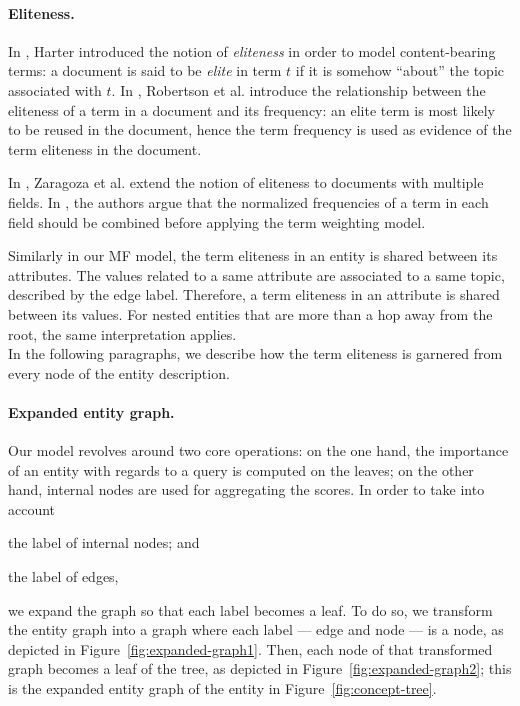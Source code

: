 \paragraph{Eliteness.}

In \cite{harter:1974:thesis}, Harter introduced the notion of \emph{eliteness} in order to model content-bearing terms: a document is said to be \emph{elite} in term $t$ if it is somehow ``about'' the topic associated with $t$. In \cite{robertson:1981:PMI}, Robertson et al. introduce the relationship between the eliteness of a term in a document and its frequency: an elite term is most likely to be reused in the document, hence the term frequency is used as evidence of the term eliteness in the document.

In \cite{zaragoza:2004:microsoft}, Zaragoza et al. extend the notion of eliteness to documents with multiple fields. In \cite{robertson:2004:cikm}, the authors argue that the normalized frequencies of a term in each field should be combined before applying the term weighting model.

Similarly in our \gls{MF} model, the term eliteness in an entity is shared between its attributes. The values related to a same attribute are associated to a same topic, described by the edge label. Therefore, a term eliteness in an attribute is shared between its values. For nested entities that are more than a hop away from the root, the same interpretation applies.\\

In the following paragraphs, we describe how the term eliteness is garnered from every node of the entity description.

\paragraph{Expanded entity graph.}

Our model revolves around two core operations: on the one hand, the importance of an entity with regards to a query is computed on the leaves; on the other hand, internal nodes are used for aggregating the scores. In order to take into account
\begin{inparaenum}[(a)]
	\item the label of internal nodes; and
	\item the label of edges,
\end{inparaenum}
we expand the graph so that each label becomes a leaf. To do so, we transform the entity graph into a graph where each label --- edge and node --- is a node, as depicted in Figure~\ref{fig:expanded-graph1}. Then, each node of that transformed graph becomes a leaf of the tree, as depicted in Figure~\ref{fig:expanded-graph2}; this is the expanded entity graph of the entity in Figure~\ref{fig:concept-tree}.

